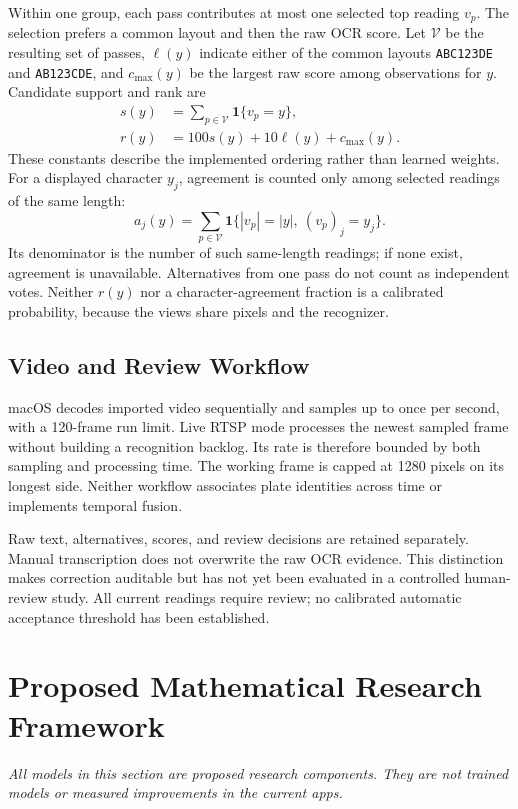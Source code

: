 \documentclass[journal]{IEEEtran}
\newcommand{\ind}{\mathbf{1}}
\begin{document}
Within one group, each pass contributes at most one selected top reading $v_p$. The selection prefers a common layout and then the raw OCR score. Let $\mathcal{V}$ be the resulting set of passes, $\ell(y)$ indicate either of the common layouts \texttt{ABC123DE} and \texttt{AB123CDE}, and $c_{\max}(y)$ be the largest raw score among observations for $y$. Candidate support and rank are
\begin{align}
 s(y)&=\sum_{p\in\mathcal{V}}\ind\{v_p=y\},\label{eq:support}\\
 r(y)&=100s(y)+10\ell(y)+c_{\max}(y).\label{eq:rank}
\end{align}
These constants describe the implemented ordering rather than learned weights. For a displayed character $y_j$, agreement is counted only among selected readings of the same length:
\begin{equation}\label{eq:character}
 a_j(y)=\sum_{p\in\mathcal{V}}\ind\{|v_p|=|y|,\ (v_p)_j=y_j\}.
\end{equation}
Its denominator is the number of such same-length readings; if none exist, agreement is unavailable. Alternatives from one pass do not count as independent votes. Neither $r(y)$ nor a character-agreement fraction is a calibrated probability, because the views share pixels and the recognizer.

\subsection{Video and Review Workflow}
macOS decodes imported video sequentially and samples up to once per second, with a 120-frame run limit. Live RTSP mode processes the newest sampled frame without building a recognition backlog. Its rate is therefore bounded by both sampling and processing time. The working frame is capped at 1280 pixels on its longest side. Neither workflow associates plate identities across time or implements temporal fusion.

Raw text, alternatives, scores, and review decisions are retained separately. Manual transcription does not overwrite the raw OCR evidence. This distinction makes correction auditable but has not yet been evaluated in a controlled human-review study. All current readings require review; no calibrated automatic acceptance threshold has been established.

\section{Proposed Mathematical Research Framework}\label{sec:proposed}
\textit{All models in this section are proposed research components. They are not trained models or measured improvements in the current apps.}
\end{document}
